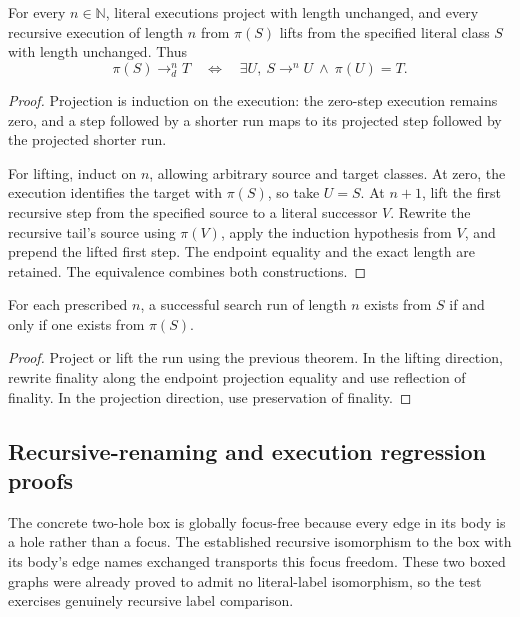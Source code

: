 \begin{theorem}
For every $n\in\mathbb N$, literal executions project with length unchanged,
and every recursive execution of length $n$ from $\pi(S)$ lifts from the
specified literal class $S$ with length unchanged. Thus
\[
 \pi(S)\longrightarrow_d^{n} T\quad\Longleftrightarrow\quad
 \exists U,\ S\longrightarrow^{n}U\ \land\ \pi(U)=T.
\]
\end{theorem}
\begin{proof}
Projection is induction on the execution: the zero-step execution remains
zero, and a step followed by a shorter run maps to its projected step followed
by the projected shorter run.

For lifting, induct on $n$, allowing arbitrary source and target classes.
At zero, the execution identifies the target with $\pi(S)$, so take $U=S$.
At $n+1$, lift the first recursive step from the specified source to a literal
successor $V$. Rewrite the recursive tail's source using $\pi(V)$, apply the
induction hypothesis from $V$, and prepend the lifted first step. The endpoint
equality and the exact length are retained. The equivalence combines both
constructions.
\end{proof}

\begin{theorem}
For each prescribed $n$, a successful search run of length $n$ exists from
$S$ if and only if one exists from $\pi(S)$.
\end{theorem}
\begin{proof}
Project or lift the run using the previous theorem. In the lifting direction,
rewrite finality along the endpoint projection equality and use reflection
of finality. In the projection direction, use preservation of finality.
\end{proof}

\subsection{Recursive-renaming and execution regression proofs}
The concrete two-hole box is globally focus-free because every edge in its
body is a hole rather than a focus. The established recursive isomorphism to
the box with its body's edge names exchanged transports this focus freedom.
These two boxed graphs were already proved to admit no literal-label
isomorphism, so the test exercises genuinely recursive label comparison.

